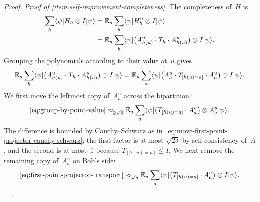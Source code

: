 \begin{proof}
  \emph{Proof of \ref{item:self-improvement-completeness}.}
  The completeness of~$H$ is
  \begin{align}
    \sum_h \langle \psi \rvert H_h \otimes I \lvert \psi \rangle
    &= \mathbb{E}_{u} \sum_h \langle \psi \rvert H^{u}_h \otimes I \lvert \psi \rangle \notag\\
    &= \mathbb{E}_{u} \sum_h \langle \psi \rvert \bigl(A^{u}_{h(u)} \cdot T_h \cdot A^{u}_{h(u)}\bigr) \otimes I \lvert \psi \rangle.
  \end{align}
  Grouping the polynomials according to their value at~$u$ gives
  \begin{equation}\label{eq:group-by-point-value}
    \mathbb{E}_{u} \sum_h \langle \psi \rvert \bigl(A^{u}_{h(u)} \cdot T_h \cdot A^{u}_{h(u)}\bigr) \otimes I \lvert \psi \rangle
    = \mathbb{E}_{u} \sum_a \langle \psi \rvert \bigl(A^{u}_{a} \cdot T_{[h(u) = a]} \cdot A^{u}_{a}\bigr) \otimes I \lvert \psi \rangle.
  \end{equation}
  We first move the leftmost copy of~$A^u_a$ across the bipartition:
  \begin{equation}\label{eq:first-point-projector-transport}
    \eqref{eq:group-by-point-value}
    \approx_{2\sqrt{\delta}}
    \mathbb{E}_{u} \sum_a \langle \psi \rvert \bigl(T_{[h(u)=a]} \cdot A^{u}_{a}\bigr) \otimes A^{u}_{a} \lvert \psi \rangle.
  \end{equation}
  The difference is bounded by Cauchy--Schwarz as
  in~\eqref{eq:move-first-point-projector-cauchy-schwarz}; the first factor is
  at most $\sqrt{2\delta}$ by self-consistency of~$A$, and the second is at
  most~$1$ because $T_{[h(u)=a]} \le I$.
  We next remove the remaining copy of~$A^u_a$ on Bob's side:
  \begin{equation}\label{eq:first-moved-completeness}
    \eqref{eq:first-point-projector-transport}
    \approx_{\sqrt{\delta}}
    \E_{u} \sum_a \bra{\psi} \bigl(T_{[h(u)=a]} \cdot A^{u}_{a}\bigr) \ot I \ket{\psi}.

\end{equation}
\end{proof}
